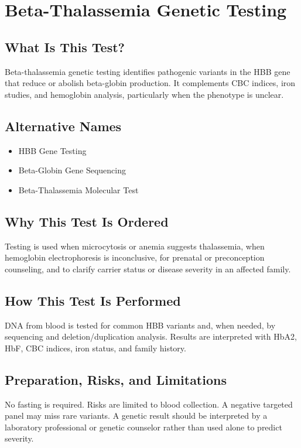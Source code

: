 \chapter{Beta-Thalassemia Genetic Testing}

\section*{What Is This Test?}
Beta-thalassemia genetic testing identifies pathogenic variants in the HBB gene that reduce or abolish beta-globin production. It complements CBC indices, iron studies, and hemoglobin analysis, particularly when the phenotype is unclear.

\section*{Alternative Names}
\begin{itemize}
  \item HBB Gene Testing
  \item Beta-Globin Gene Sequencing
  \item Beta-Thalassemia Molecular Test
\end{itemize}
\section*{Why This Test Is Ordered}
Testing is used when microcytosis or anemia suggests thalassemia, when hemoglobin electrophoresis is inconclusive, for prenatal or preconception counseling, and to clarify carrier status or disease severity in an affected family.

\section*{How This Test Is Performed}
DNA from blood is tested for common HBB variants and, when needed, by sequencing and deletion/duplication analysis. Results are interpreted with HbA2, HbF, CBC indices, iron status, and family history.

\section*{Preparation, Risks, and Limitations}
No fasting is required. Risks are limited to blood collection. A negative targeted panel may miss rare variants. A genetic result should be interpreted by a laboratory professional or genetic counselor rather than used alone to predict severity.

